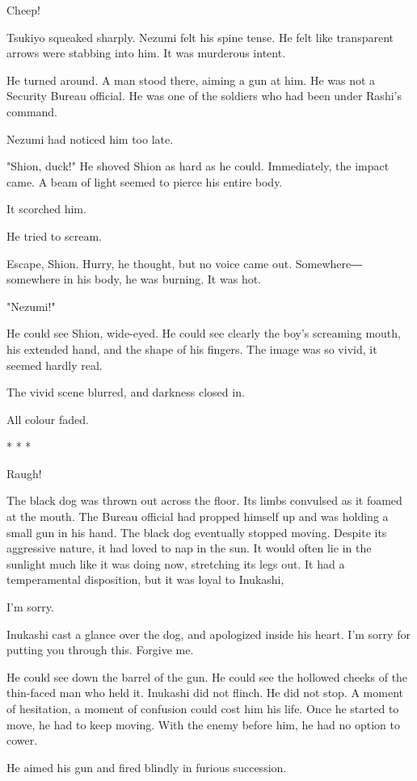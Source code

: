 Cheep!

Tsukiyo squeaked sharply. Nezumi felt his spine tense. He felt like
transparent arrows were stabbing into him. It was murderous intent.

He turned around. A man stood there, aiming a gun at him. He was not a
Security Bureau official. He was one of the soldiers who had been under
Rashi's command.

Nezumi had noticed him too late.

"Shion, duck!" He shoved Shion as hard as he could. Immediately, the
impact came. A beam of light seemed to pierce his entire body.

It scorched him.

He tried to scream.

Escape, Shion. Hurry, he thought, but no voice came out. Somewhere―
somewhere in his body, he was burning. It was hot.

"Nezumi!"

He could see Shion, wide-eyed. He could see clearly the boy's screaming
mouth, his extended hand, and the shape of his fingers. The image was so
vivid, it seemed hardly real.

The vivid scene blurred, and darkness closed in.

All colour faded.

* * *

Raugh!

The black dog was thrown out across the floor. Its limbs convulsed as it
foamed at the mouth. The Bureau official had propped himself up and was
holding a small gun in his hand. The black dog eventually stopped
moving. Despite its aggressive nature, it had loved to nap in the sun.
It would often lie in the sunlight much like it was doing now,
stretching its legs out. It had a temperamental disposition, but it was
loyal to Inukashi,

I'm sorry.

Inukashi cast a glance over the dog, and apologized inside his heart.
I'm sorry for putting you through this. Forgive me.

He could see down the barrel of the gun. He could see the hollowed
cheeks of the thin-faced man who held it. Inukashi did not flinch. He
did not stop. A moment of hesitation, a moment of confusion could cost
him his life. Once he started to move, he had to keep moving. With the
enemy before him, he had no option to cower.

He aimed his gun and fired blindly in furious succession.

